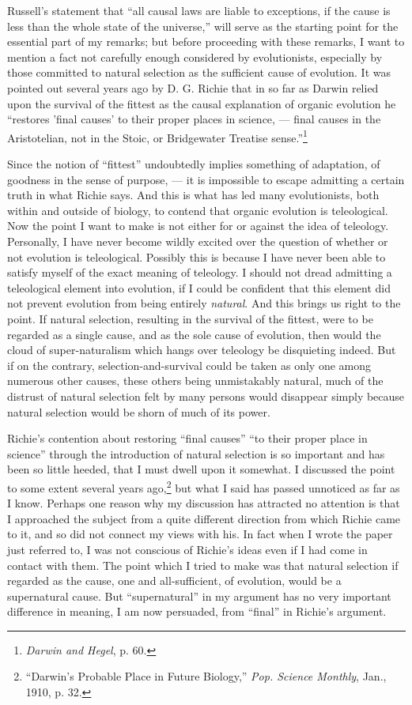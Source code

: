 \documentclass[a4paper, 11pt, oneside, polutonikogreek, english, landscape]{article}
\begin{document}
Russell's statement that ``all causal laws are liable to exceptions, if the cause is less than the whole state of the universe,'' will serve as the starting point for the essential part of my remarks; but before proceeding with these remarks, I want to mention a fact not carefully enough considered by evolutionists, especially by those committed to natural selection as the sufficient cause of evolution. It was pointed out several years ago by D. G. Richie that in so far as Darwin relied upon the survival of the fittest as the causal explanation of organic evolution he ``restores 'final causes' to their proper places in science, --- final causes in the Aristotelian, not in the Stoic, or Bridgewater Treatise sense.''\footnote{\emph{Darwin and Hegel}, p. 60.}

Since the notion of ``fittest'' undoubtedly implies something of adaptation, of goodness in the sense of purpose, --- it is impossible to escape admitting a certain truth in what Richie says. And this is what has led many evolutionists, both within and outside of biology, to contend that organic evolution is teleological. Now the point I want to make is not either for or against the idea of teleology. Personally, I have never become wildly excited over the question of whether or not evolution is teleological. Possibly this is because I have never been able to satisfy myself of the exact meaning of teleology. I should not dread admitting a teleological element into evolution, if I could be confident that this element did not prevent evolution from being entirely \emph{natural}. And this brings us right to the point. If natural selection, resulting in the survival of the fittest, were to be regarded as a single cause, and as the sole cause of evolution, then would the cloud of super-naturalism which hangs over teleology be disquieting indeed. But if on the contrary, selection-and-survival could be taken as only one among numerous other causes, these others being unmistakably natural, much of the distrust of natural selection felt by many persons would disappear simply because natural selection would be shorn of much of its power.

Richie's contention about restoring ``final causes'' ``to their proper place in science'' through the introduction of natural selection is so important and has been so little heeded, that I must dwell upon it somewhat. I discussed the point to some extent several years ago,\footnote{``Darwin's Probable Place in Future Biology,'' \emph{Pop. Science Monthly}, Jan., 1910, p. 32.} but what I said has passed unnoticed as far as I know. Perhaps one reason why my discussion has attracted no attention is that I approached the subject from a quite different direction from which Richie came to it, and so did not connect my views with his. In fact when I wrote the paper just referred to, I was not conscious of Richie's ideas even if I had come in contact with them. The point which I tried to make was that natural selection if regarded as the cause, one and all-sufficient, of evolution, would be a supernatural cause. But ``supernatural'' in my argument has no very important difference in meaning, I am now persuaded, from ``final'' in Richie's argument.
\end{document}
